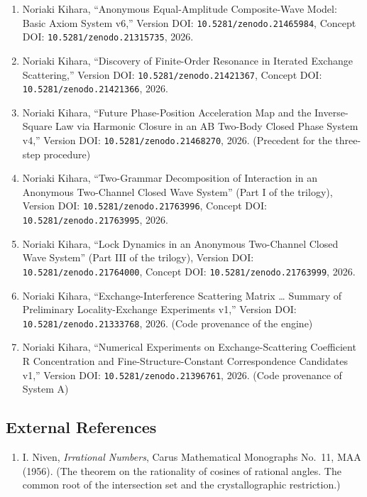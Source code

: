 \documentclass[
  a4paper,
]{article}
\providecommand{\tightlist}{%
  \setlength{\itemsep}{0pt}\setlength{\parskip}{0pt}}
\begin{document}
\begin{enumerate}
\def\labelenumi{\arabic{enumi}.}
\tightlist
\item
  Noriaki Kihara, ``Anonymous Equal-Amplitude Composite-Wave Model:
  Basic Axiom System v6,'' Version DOI:
  \texttt{10.5281/zenodo.21465984}, Concept DOI:
  \texttt{10.5281/zenodo.21315735}, 2026.
\item
  Noriaki Kihara, ``Discovery of Finite-Order Resonance in Iterated
  Exchange Scattering,'' Version DOI: \texttt{10.5281/zenodo.21421367},
  Concept DOI: \texttt{10.5281/zenodo.21421366}, 2026.
\item
  Noriaki Kihara, ``Future Phase-Position Acceleration Map and the
  Inverse-Square Law via Harmonic Closure in an AB Two-Body Closed Phase
  System v4,'' Version DOI: \texttt{10.5281/zenodo.21468270}, 2026.
  (Precedent for the three-step procedure)
\item
  Noriaki Kihara, ``Two-Grammar Decomposition of Interaction in an
  Anonymous Two-Channel Closed Wave System'' (Part I of the trilogy),
  Version DOI: \texttt{10.5281/zenodo.21763996}, Concept DOI:
  \texttt{10.5281/zenodo.21763995}, 2026.
\item
  Noriaki Kihara, ``Lock Dynamics in an Anonymous Two-Channel Closed
  Wave System'' (Part III of the trilogy), Version DOI:
  \texttt{10.5281/zenodo.21764000}, Concept DOI:
  \texttt{10.5281/zenodo.21763999}, 2026.
\item
  Noriaki Kihara, ``Exchange-Interference Scattering Matrix \ldots{}
  Summary of Preliminary Locality-Exchange Experiments v1,'' Version
  DOI: \texttt{10.5281/zenodo.21333768}, 2026. (Code provenance of the
  engine)
\item
  Noriaki Kihara, ``Numerical Experiments on Exchange-Scattering
  Coefficient R Concentration and Fine-Structure-Constant Correspondence
  Candidates v1,'' Version DOI: \texttt{10.5281/zenodo.21396761}, 2026.
  (Code provenance of System A)
\end{enumerate}

\subsection{External References}\label{external-references}

\begin{enumerate}
\def\labelenumi{\arabic{enumi}.}
\setcounter{enumi}{7}
\tightlist
\item
  I. Niven, \emph{Irrational Numbers}, Carus Mathematical Monographs
  No.~11, MAA (1956). (The theorem on the rationality of cosines of
  rational angles. The common root of the intersection set and the
  crystallographic restriction.)
\end{enumerate}
\end{document}
